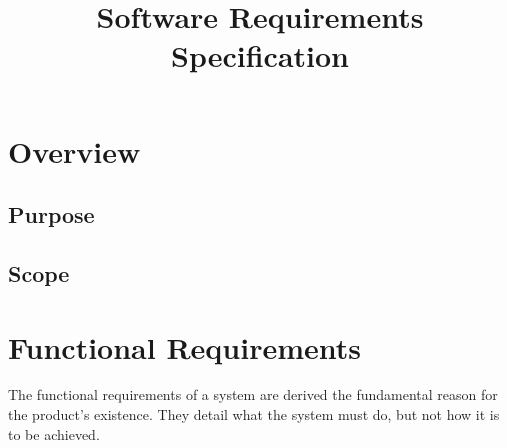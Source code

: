 \documentclass[11pt]{article} %
\title{Software Requirements Specification}
\author{}
\begin{document}
\maketitle

\section{Overview}

\subsection{Purpose}

\subsection{Scope}

\section{Functional Requirements}

The functional requirements of a system are derived the fundamental reason for the product's existence. They detail what the system must do, but not how it is to be achieved.
\end{document}
